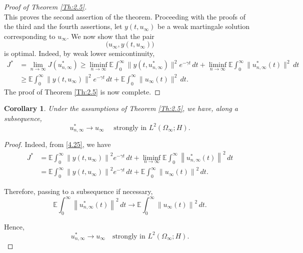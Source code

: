 \documentclass[a4paper,12pt]{article}
\newtheorem{corollary}[definition]{Corollary}
\numberwithin{equation}{section}
\begin{document}
\begin{proof}[Proof of Theorem \ref{Th:2.5}]
\[\]
This proves the second assertion of the theorem. Proceeding with the proofs of the third and the fourth assertions, let $y(t,u_\infty)$ be a weak martingale solution corresponding to
$u_\infty$. We now show that the pair
\[
\bigl(u_\infty,y(t,u_\infty)\bigr)
\]
is optimal. Indeed, by  weak lower semicontinuity,
\begin{align}
J^*
&=
\lim_{n\to\infty}
J(u_{n,\infty}^*) \geq
\liminf_{n\to\infty}
\mathbb{E}
\int_0^\infty
\|y(t,u_{n,\infty}^*)\|^2
e^{-\gamma t}\,dt
+
\liminf_{n\to\infty}
\mathbb{E}
\int_0^\infty
\|u_{n,\infty}^*(t)\|^2\,dt
\nonumber\\
&\geq
\mathbb{E}
\int_0^\infty
\|y(t,u_\infty)\|^2
e^{-\gamma t}\,dt
+
\mathbb{E}
\int_0^\infty
\|u_\infty(t)\|^2\,dt.
\label{4.25}
\end{align}
The proof of Theorem \ref{Th:2.5} is now complete.
\end{proof}

\begin{corollary}
Under the assumptions of Theorem \ref{Th:2.5}, we have, along a subsequence,
\[
u_{n,\infty}^*
\to
u_\infty
\quad\text{ strongly in }
L^2(\Omega_\infty;H).
\]
\end{corollary}
\begin{proof}
Indeed, from \eqref{4.25}, we have
\[
\begin{aligned}
J^*
&=
\mathbb{E}
\int_0^\infty
\left\|
y(t,u_\infty)
\right\|^2
e^{-\gamma t}\,dt
+
\liminf_{n\to\infty}
\mathbb{E}
\int_0^\infty
\left\|
u_{n,\infty}^*(t)
\right\|^2\,dt
\\
&=
\mathbb{E}
\int_0^\infty
\left\|
y(t,u_\infty)
\right\|^2
e^{-\gamma t}\,dt
+
\mathbb{E}
\int_0^\infty
\left\|
u_\infty(t)
\right\|^2\,dt.
\end{aligned}
\]

Therefore, passing to a subsequence if necessary,
\[
\mathbb{E}
\int_0^\infty
\left\|
u_{n,\infty}^*(t)
\right\|^2\,dt
\to
\mathbb{E}
\int_0^\infty
\left\|
u_\infty(t)
\right\|^2\,dt.
\]

Hence,
\[
u_{n,\infty}^*
\to
u_\infty
\quad\text{strongly in }
L^2(\Omega_\infty;H).
\]
\end{proof}
\end{document}
